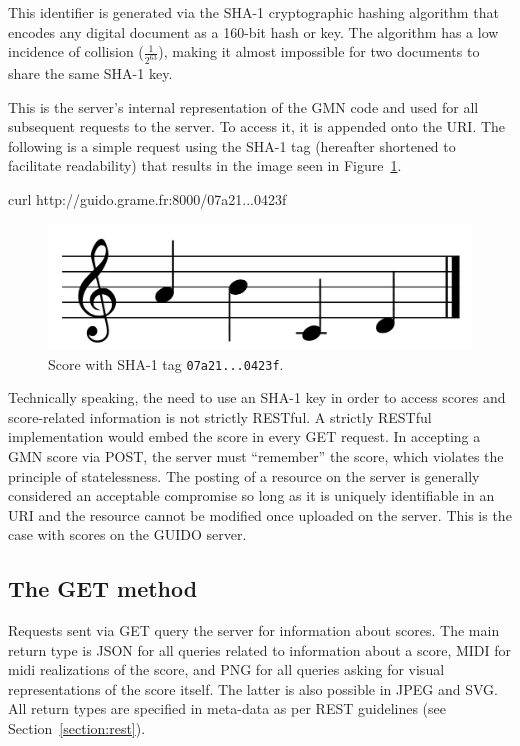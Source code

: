 \documentclass[11pt,a4paper]{article}
\newenvironment{code}		{\vspace{-2mm} \fontsize{8.5pt}{12pt}\selectfont \verbatim}{\endverbatim\vspace{-2mm}}
\begin{document}
This identifier is generated via the SHA-1 cryptographic hashing algorithm \cite{sha1} that encodes any digital document as a 160-bit hash or key.  The algorithm has a low incidence of collision ($\frac{1}{2^{63}}$), making it almost impossible for two documents to share the same SHA-1 key.\par
This is the server's internal representation of the GMN code and used for all subsequent requests to the server.  To access it, it is appended onto the URI.  The following is a simple request using the SHA-1 tag (hereafter shortened to facilitate readability) that results in the image seen in Figure~\ref{fig:figure1}.\par
\begin{code}
   curl http://guido.grame.fr:8000/07a21...0423f
\end{code}
\begin{figure}[h]
  \centering
    \includegraphics[width=0.6\columnwidth]{figure1}
  \cprotect\caption{\label{fig:figure1}Score with SHA-1 tag \verb=07a21...0423f=.}
\end{figure}\par
Technically speaking, the need to use an SHA-1 key in order to access scores and score-related information is not strictly RESTful.  A strictly RESTful implementation would embed the score in every GET request. In accepting a GMN score via POST, the server must ``remember'' the score, which violates the principle of statelessness.  The posting of a resource on the server is generally considered an acceptable compromise \cite{richardson2008restful} so long as it is uniquely identifiable in an URI and the resource cannot be modified once uploaded on the server.  This is the case with scores on the GUIDO server.\par

\subsection{The GET method}\label{subsection:get}
Requests sent via GET query the server for information about scores. The main return type is JSON for all queries related to information about a score, MIDI for midi realizations of the score, and PNG for all queries asking for visual representations of the score itself.  The latter is also possible in JPEG and SVG.  All return types are specified in meta-data as per REST guidelines (see Section~\ref{section:rest}).\par
\end{document}
